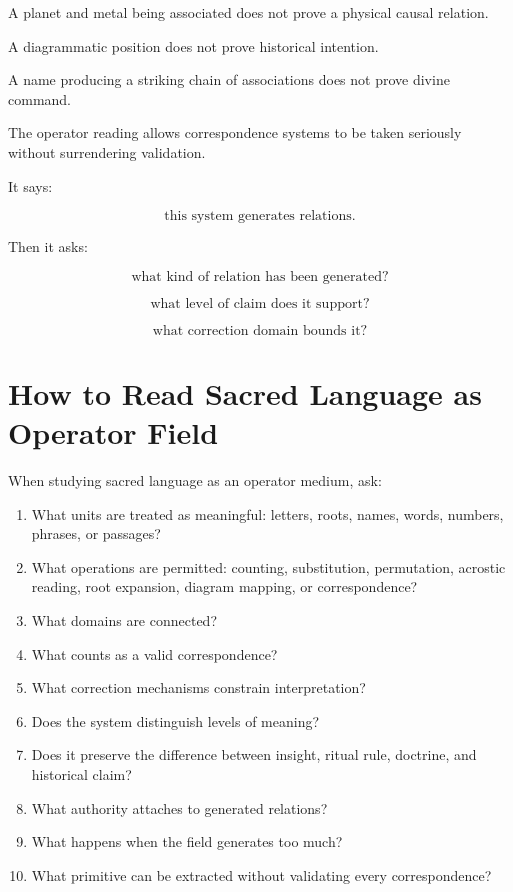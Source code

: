\documentclass[11pt]{book}
\begin{document}
A planet and metal being associated does not prove a physical causal relation.

A diagrammatic position does not prove historical intention.

A name producing a striking chain of associations does not prove divine command.

The operator reading allows correspondence systems to be taken seriously without surrendering validation.

It says:

\[
\text{this system generates relations}.
\]

Then it asks:

\[
\text{what kind of relation has been generated?}
\]

\[
\text{what level of claim does it support?}
\]

\[
\text{what correction domain bounds it?}
\]

\section{How to Read Sacred Language as Operator Field}

When studying sacred language as an operator medium, ask:

\begin{enumerate}[label=\arabic*.]
    \item What units are treated as meaningful: letters, roots, names, words, numbers, phrases, or passages?
    \item What operations are permitted: counting, substitution, permutation, acrostic reading, root expansion, diagram mapping, or correspondence?
    \item What domains are connected?
    \item What counts as a valid correspondence?
    \item What correction mechanisms constrain interpretation?
    \item Does the system distinguish levels of meaning?
    \item Does it preserve the difference between insight, ritual rule, doctrine, and historical claim?
    \item What authority attaches to generated relations?
    \item What happens when the field generates too much?
    \item What primitive can be extracted without validating every correspondence?
\end{enumerate}
\end{document}
